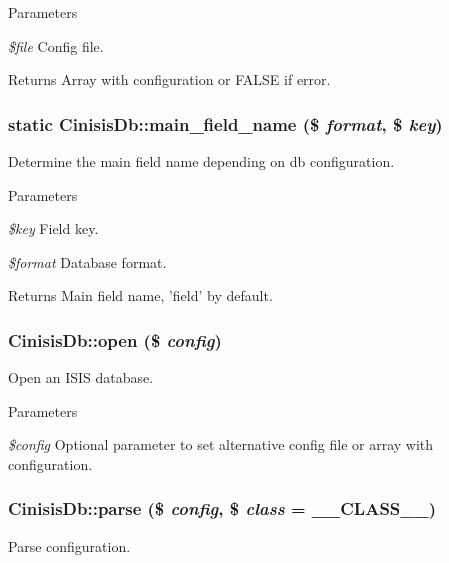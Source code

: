 \begin{DoxyParams}{Parameters}
\item[{\em \$file}]Config file.\end{DoxyParams}
\begin{DoxyReturn}{Returns}
Array with configuration or FALSE if error. 
\end{DoxyReturn}
\hypertarget{classCinisisDb_a5f0fe8ae1b21721f759bde7fc260a283}{
\subsubsection[{main\_\-field\_\-name}]{\setlength{\rightskip}{0pt plus 5cm}static CinisisDb::main\_\-field\_\-name (\$ {\em format}, \/  \$ {\em key})}}
\label{classCinisisDb_a5f0fe8ae1b21721f759bde7fc260a283}
Determine the main field name depending on db configuration.


\begin{DoxyParams}{Parameters}
\item[{\em \$key}]Field key.\item[{\em \$format}]Database format.\end{DoxyParams}
\begin{DoxyReturn}{Returns}
Main field name, 'field' by default. 
\end{DoxyReturn}
\hypertarget{classCinisisDb_ab6fe06865770b4ade264116627cab487}{
\subsubsection[{open}]{\setlength{\rightskip}{0pt plus 5cm}CinisisDb::open (\$ {\em config})}}
\label{classCinisisDb_ab6fe06865770b4ade264116627cab487}
Open an ISIS database.


\begin{DoxyParams}{Parameters}
\item[{\em \$config}]Optional parameter to set alternative config file or array with configuration. \end{DoxyParams}
\hypertarget{classCinisisDb_a5b0ec2897d714c79c673d5950dde8e14}{
\subsubsection[{parse}]{\setlength{\rightskip}{0pt plus 5cm}CinisisDb::parse (\$ {\em config}, \/  \$ {\em class} = {\ttfamily \_\-\_\-CLASS\_\-\_\-})}}
\label{classCinisisDb_a5b0ec2897d714c79c673d5950dde8e14}
Parse configuration.


